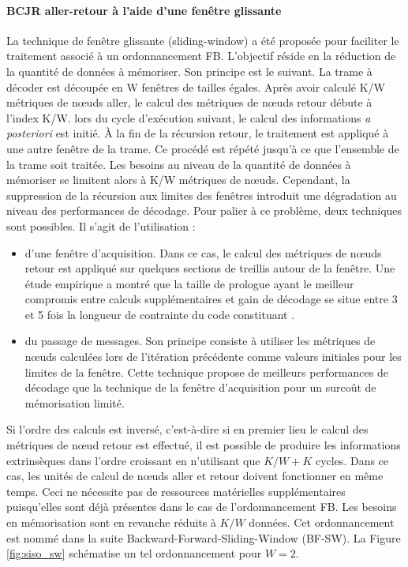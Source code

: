 \paragraph*{BCJR aller-retour à l'aide d'une fenêtre glissante}
La technique de fenêtre glissante (sliding-window) a été proposée pour faciliter le traitement associé à un ordonnancement
FB. L'objectif réside en
la réduction de la quantité de données à mémoriser. Son principe est le suivant. La trame à décoder est découpée en W fenêtres 
de tailles égales. Après avoir calculé K/W métriques de nœuds aller, le calcul des métriques de nœuds retour débute à l'index K/W. lors du cycle d'exécution suivant, le calcul des informations \textit{a posteriori} est initié. À la fin de la 
récursion retour, le traitement est appliqué à une autre fenêtre de la trame. Ce procédé est répété jusqu'à ce que l'ensemble de la trame
soit traitée. Les besoins au niveau de la quantité de données à mémoriser se limitent alors à K/W métriques de nœuds. 
Cependant, la suppression de la 
récursion aux limites des fenêtres introduit une dégradation au niveau des performances de décodage. Pour palier à ce problème, deux 
techniques sont possibles. Il s'agit de l'utilisation : 
\begin{itemize}
	\item d'une fenêtre d'acquisition. Dans ce cas, le calcul des métriques de nœuds retour est appliqué sur 
	quelques sections de treillis autour de la fenêtre. Une étude empirique a montré que la 
	taille de prologue ayant le meilleur compromis entre calculs supplémentaires et gain de 
	décodage se situe entre 3 et 5 fois la longueur de contrainte du code constituant \cite{sw_init}.
	\item du passage de messages. Son principe consiste à utiliser les métriques de nœuds calculées lors de l'itération 
	précédente comme valeurs initiales pour les limites de la fenêtre. Cette technique propose de meilleurs 
	performances de décodage que la technique de la fenêtre d'acquisition pour un surcoût de mémorisation limité.\\
\end{itemize}

Si l'ordre des calculs est inversé, c'est-à-dire si en premier lieu le calcul des métriques de nœud retour est 
effectué, il est possible de produire les informations extrinsèques dans l'ordre croissant en n'utilisant que $K/W + K$
cycles. Dans ce cas, les unités de calcul de nœuds aller et retour doivent fonctionner en même temps. Ceci ne 
nécessite pas de ressources matérielles supplémentaires puisqu'elles sont déjà présentes dans le cas de l'ordonnancement 
FB. Les besoins en mémorisation sont en revanche réduits à $K/W$ données. Cet ordonnancement est nommé dans la suite 
Backward-Forward-Sliding-Window (BF-SW). La Figure \ref{fig:siso_sw} schématise un tel ordonnancement pour $W=2$.

